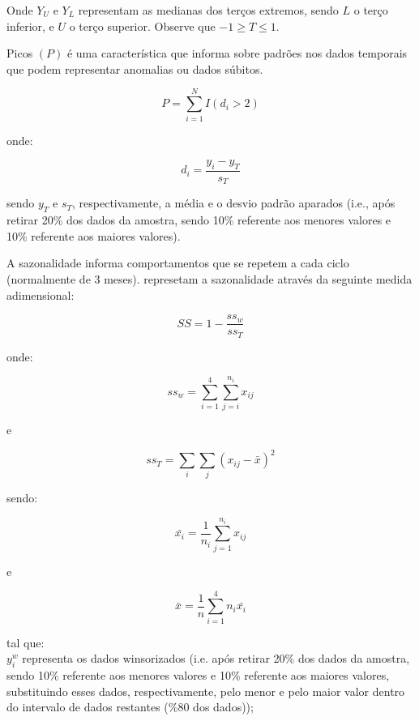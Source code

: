 \documentclass[11pt,letterpaper,twocolumn]{article}
\begin{document}
Onde $Y_U$ e $Y_L$ representam as medianas dos terços extremos, sendo $L$ o terço inferior, e $U$ o terço superior. Observe que $-1 \geq T \leq 1$.

Picos $(P)$ é uma característica que informa sobre padrões nos dados temporais que podem representar anomalias ou dados súbitos.

\begin{equation}
P = \sum_{i=1}^{N}{I(d_i > 2)}
\end{equation}

onde:

\begin{equation}
d_i = \frac{y_i - y_{T}}{s_{T}}
\end{equation}

sendo $y_{T}$ e $s_{T}$, respectivamente, a média e o desvio padrão aparados (i.e., após retirar 20\% dos dados da amostra, sendo 10\% referente aos menores valores e 10\% referente aos maiores valores).

A sazonalidade informa comportamentos que se repetem a cada ciclo (normalmente de 3 meses). \cite{BusingerRead1999} represetam a sazonalidade através da seguinte medida adimensional:

\begin{equation}
SS = 1 - \frac{ss_{w}}{ss_{T}}
\end{equation}

onde:

\begin{equation}
ss_{w} = \sum_{i=1}^{4}\sum_{j=i}^{n_i}{x_{ij}}
\end{equation}

e

\begin{equation}
ss_{T} = \sum_{i}\sum_{j}{(x_{ij}-\bar{x})^2}
\end{equation}

sendo:

\begin{equation}
\bar{x_i} = \frac{1}{n_i} \sum_{j=1}^{n_i}{x_{ij}}
\end{equation}

e

\begin{equation}
\bar{x} = \frac{1}{n} \sum_{i=1}^{4}{n_i \bar{x_i}}
\end{equation}

tal que: \\

$y_{i}^w$ representa os dados winsorizados (i.e. após retirar 20\% dos dados da amostra, sendo 10\% referente aos menores valores e 10\% referente aos maiores valores, substituindo esses dados, respectivamente, pelo menor e pelo maior valor dentro do intervalo de dados restantes (\%80 dos dados)); \\
\end{document}
